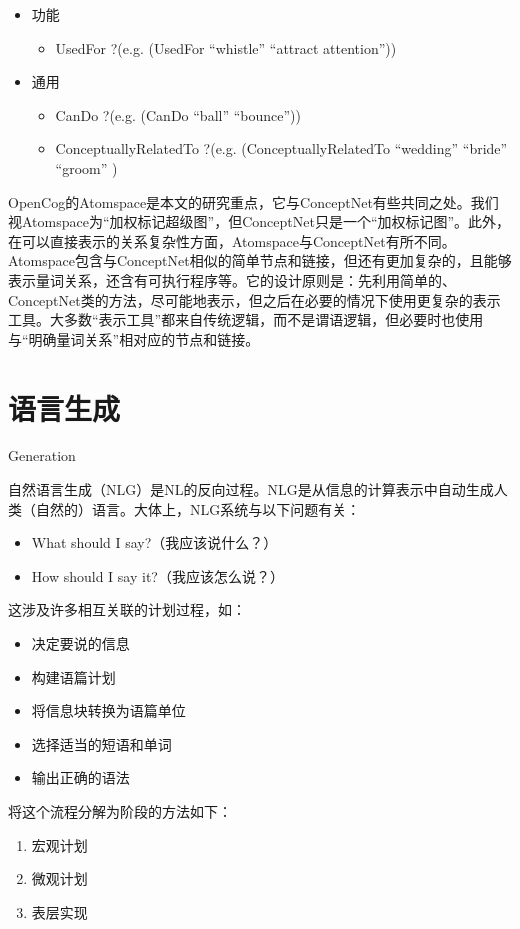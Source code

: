 \begin{itemize}
\item 功能
\begin{itemize} 
\item UsedFor ?(e.g. (UsedFor ``whistle'' ``attract attention''))
\end{itemize}

\item 通用 
\begin{itemize}
\item CanDo ?(e.g. (CanDo ``ball'' ``bounce''))
\item ConceptuallyRelatedTo ?(e.g. (ConceptuallyRelatedTo ``wedding'' ``bride'' ``groom'' )
\end{itemize}
\end{itemize}


OpenCog的Atomspace是本文的研究重点，它与ConceptNet有些共同之处。我们视Atomspace为“加权标记超级图”，但ConceptNet只是一个“加权标记图”。此外，在可以直接表示的关系复杂性方面，Atomspace与ConceptNet有所不同。Atomspace包含与ConceptNet相似的简单节点和链接，但还有更加复杂的，且能够表示量词关系，还含有可执行程序等。它的设计原则是：先利用简单的、ConceptNet类的方法，尽可能地表示，但之后在必要的情况下使用更复杂的表示工具。大多数“表示工具”都来自传统逻辑，而不是谓语逻辑，但必要时也使用与“明确量词关系”相对应的节点和链接。


\section{语言生成}{Generation}

自然语言生成（NLG）是NL的反向过程。NLG是从信息的计算表示中自动生成人类（自然的）语言。大体上，NLG系统与以下问题有关：

\begin{itemize}
\item What should I say?（我应该说什么？）
\item How should I say it?（我应该怎么说？）
\end{itemize}

这涉及许多相互关联的计划过程，如：
\begin{itemize}
\item 决定要说的信息
\item 构建语篇计划
\item 将信息块转换为语篇单位
\item 选择适当的短语和单词
\item 输出正确的语法
\end{itemize}

将这个流程分解为阶段的方法如下：
\begin{enumerate}
\item 宏观计划
\item 微观计划
\item 表层实现
\end{enumerate}

